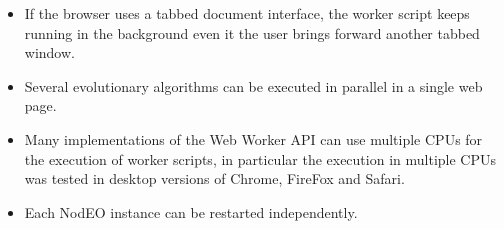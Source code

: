 \documentclass[journal,onecolumn]{IEEEtran}
\begin{document}
\begin{itemize}
\item If the browser uses a tabbed document interface, the worker script
keeps running in the background even it the user brings forward another tabbed
window.
\item Several evolutionary algorithms can be executed in parallel in a single web
page. %
\item Many implementations of the Web Worker API can use multiple CPUs for
the execution of worker scripts, in particular the execution in multiple CPUs
was tested in desktop versions of Chrome, FireFox and Safari.
\item Each NodEO instance can be restarted independently.
\end{itemize}
\end{document}
